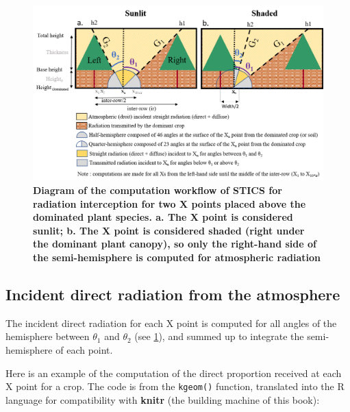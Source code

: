 \documentclass[]{book}
\theoremstyle{definition}
\theoremstyle{definition}
\theoremstyle{definition}
\theoremstyle{remark}
\begin{document}
\begin{figure}
\centering
\includegraphics{img/Light-interception-dominated.png}
\caption{\label{fig:Compdominated}\textbf{Diagram of the computation
workflow of STICS for radiation interception for two X points placed
above the dominated plant species. a. The X point is considered sunlit;
b. The X point is considered shaded (right under the dominant plant
canopy), so only the right-hand side of the semi-hemisphere is computed
for atmospheric radiation}}
\end{figure}

\subsection{Incident direct radiation from the
atmosphere}\label{incident-direct-radiation-from-the-atmosphere}

The incident direct radiation for each X point is computed for all
angles of the hemisphere between \(\theta_1\) and \(\theta_2\) (see
\ref{fig:Compdominated}), and summed up to integrate the semi-hemisphere
of each point.

Here is an example of the computation of the direct proportion received
at each X point for a crop. The code is from the \texttt{kgeom()}
function, translated into the R language for compatibility with
\textbf{knitr} (the building machine of this book):
\end{document}

